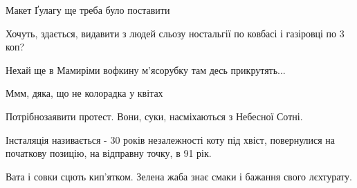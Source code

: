 \begin{itemize}
 
Макет Ґулагу ще треба було поставити

 
Хочуть, здається, видавити з людей сльозу ностальгії по ковбасі і газіровці по 3 коп?

 
Нехай ще в Мамиріми вофкину м'ясорубку там десь прикрутять...

 
Ммм, дяка, що не колорадка у квітах

 
Потрібнозаявити протест. Вони, суки, насміхаються з Небесної Сотні.

 

Інсталяція називається - 30 років незалежності коту під хвіст, повернулися на
початкову позицію, на відправну точку, в 91 рік.

Вата і совки сцють кип'ятком. Зелена жаба знає смаки і бажання свого лєхтурату.


\end{itemize}
